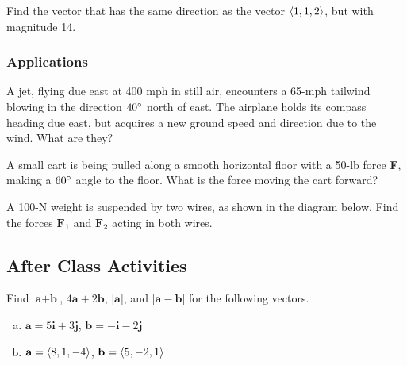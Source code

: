 \documentclass[notes]{subfiles}
\begin{document}
		\begin{ex}
			Find the vector that has the same direction as the vector $\left\langle 1,1,2\right\rangle$, but with magnitude 14.
		\end{ex}
	\subsubsection*{Applications}		
		\begin{ex}
			A jet, flying due east at 400 mph in still air, encounters a 65-mph tailwind blowing in the direction $40^\circ$ north of east.  The airplane holds its compass heading due east, but acquires a new ground speed and direction due to the wind.  What are they?
		\end{ex}
			
		\begin{ex}
			A small cart is being pulled along a smooth horizontal floor with a 50-lb force \textbf{F}, making a $60^\circ$ angle to the floor.  What is the force moving the cart forward?
		\end{ex}
			\newpage
			
		\begin{ex}
			A 100-N weight is suspended by two wires, as shown in the diagram below.  Find the forces $\mathbf{F_1}$ and $\mathbf{F_2}$ acting in both wires.
		\end{ex}
		\begin{flushleft}
		\end{flushleft}

			\newpage
	\subsection*{After Class Activities}
		\begin{ex}
			Find $\textbf{a} + \textbf{b}$, $4\textbf{a} + 2\textbf{b}$, $|\textbf{a}|$, and $|\textbf{a} - \textbf{b}|$ for the following vectors.
			\begin{enumerate}[(a)]
				\item $\textbf{a} = 5\textbf{i} + 3\textbf{j}$, $\textbf{b} = -\textbf{i} - 2\textbf{j}$
					
				\item $\textbf{a} = \left\langle 8,1,-4\right\rangle$, $\textbf{b} = \left\langle 5,-2,1\right\rangle$
			\end{enumerate}
		\end{ex}
		
\end{document}
